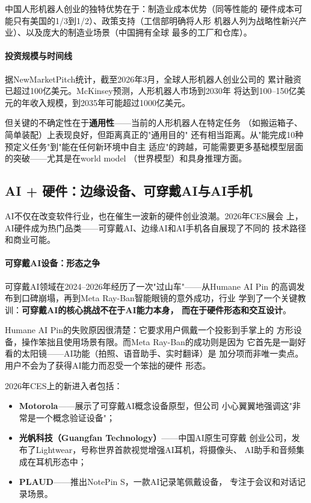中国人形机器人创业的独特优势在于：制造业成本优势（同等性能的
硬件成本可能只有美国的1/3到1/2）、政策支持（工信部明确将人形
机器人列为战略性新兴产业）、以及庞大的制造业场景（中国拥有全球
最多的工厂和仓库）。

\paragraph{投资规模与时间线}
据NewMarketPitch统计，截至2026年3月，全球人形机器人创业公司的
累计融资已超过100亿美元。McKinsey预测，人形机器人市场到2030年
将达到100--150亿美元的年收入规模，到2035年可能超过1000亿美元。

但关键的不确定性在于\textbf{通用性}——当前的人形机器人在特定任务
（如搬运箱子、简单装配）上表现良好，但距离真正的"通用目的"
还有相当距离。从"能完成10种预定义任务"到"能在任何新环境中自主
适应"的跨越，可能需要更多基础模型层面的突破——尤其是在world model
（世界模型）和具身推理方面。


\subsection{AI + 硬件：边缘设备、可穿戴AI与AI手机}
\label{subsec:outlook-ai-hardware}

AI不仅在改变软件行业，也在催生一波新的硬件创业浪潮。2026年CES展会
上，AI硬件成为热门品类——可穿戴AI、边缘AI和AI手机各自展现了不同的
技术路径和商业可能。

\paragraph{可穿戴AI设备：形态之争}
可穿戴AI领域在2024--2026年经历了一次"过山车"——从Humane AI Pin
的高调发布到口碑崩塌，再到Meta Ray-Ban智能眼镜的意外成功，行业
学到了一个关键教训：\textbf{可穿戴AI的核心挑战不在于AI能力本身，
而在于硬件形态和交互设计}。

Humane AI Pin的失败原因很清楚：它要求用户佩戴一个投影到手掌上的
方形设备，操作笨拙且使用场景有限。而Meta Ray-Ban的成功则是因为
它首先是一副好看的太阳镜——AI功能（拍照、语音助手、实时翻译）是
加分项而非唯一卖点。用户不会为了获得AI能力而忍受一个笨拙的硬件
形态。

2026年CES上的新进入者包括：
\begin{itemize}
  \item \textbf{Motorola}——展示了可穿戴AI概念设备原型，但公司
    小心翼翼地强调这"非常是一个概念验证设备"；
  \item \textbf{光帆科技（Guangfan Technology）}——中国AI原生可穿戴
    创业公司，发布了Lightwear，号称世界首款视觉增强AI耳机，将摄像头、
    AI助手和音频集成在耳机形态中；
  \item \textbf{PLAUD}——推出NotePin S，一款AI记录笔佩戴设备，
    专注于会议和对话记录场景。
\end{itemize}

